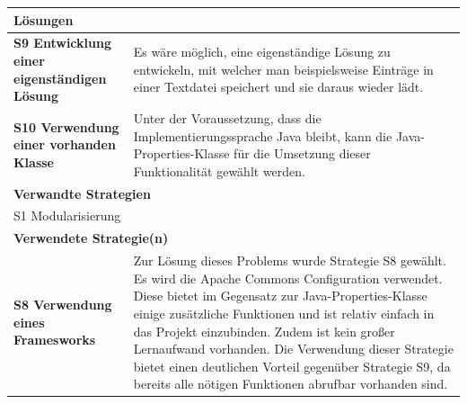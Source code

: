 \documentclass[fontsize=12pt,paper=a4,twoside]{scrartcl}
\begin{document}
\begin{tabularx}{\textwidth}{|p{6cm}|X|}
\hline
\multicolumn{2}{|l|}{\textbf{Lösungen}} \\\hline
\textbf{S9 Entwicklung einer eigenständigen Lösung} & Es wäre möglich, eine eigenständige Lösung zu entwickeln, mit welcher man beispielsweise Einträge in einer Textdatei speichert und sie daraus wieder lädt. \\
\textbf{S10 Verwendung einer vorhanden Klasse} & Unter der Voraussetzung, dass die Implementierungssprache Java bleibt, kann die Java-Properties-Klasse für die Umsetzung dieser Funktionalität gewählt werden. \\\hline
 \multicolumn{2}{|l|}{\textbf{Verwandte Strategien}} \\\hline
  \multicolumn{2}{|l|}{S1 Modularisierung} \\\hline
\multicolumn{2}{|l|}{\textbf{Verwendete Strategie(n)}} \\\hline
\textbf{S8 Verwendung eines Framesworks} & Zur Lösung dieses Problems wurde Strategie S8 gewählt. Es wird die Apache Commons Configuration verwendet. Diese bietet im Gegensatz zur Java-Properties-Klasse einige zusätzliche Funktionen und ist relativ einfach in das Projekt einzubinden. Zudem ist kein großer Lernaufwand vorhanden. Die Verwendung dieser Strategie bietet einen deutlichen Vorteil gegenüber Strategie S9, da bereits alle nötigen Funktionen abrufbar vorhanden sind.\\\hline
\end{tabularx}
\end{document}
